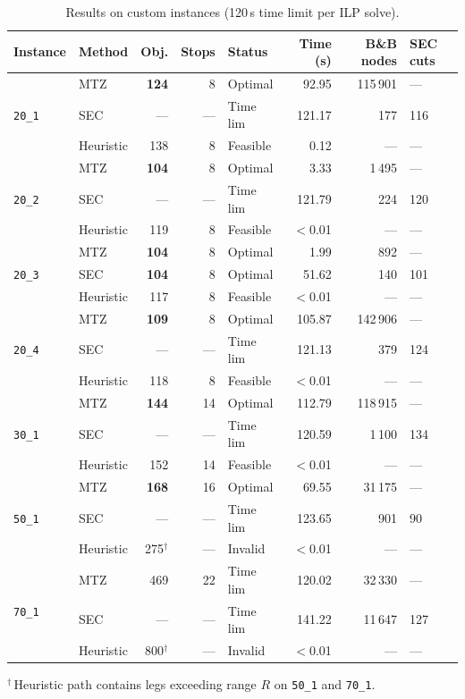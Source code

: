 \documentclass[12pt, a4paper]{article}
\begin{document}
\begin{table}[H]
\centering
\caption{Results on custom instances (120\,s time limit per ILP solve).}
\label{tab:custom_results}
\begin{tabular}{llrrlrrl}
\toprule
Instance & Method & Obj. & Stops & Status & Time (s) & B\&B nodes & SEC cuts \\
\midrule
\multirow{3}{*}{\texttt{20\_1}}
  & MTZ       & \textbf{124} & 8 & Optimal   &  92.95 & 115\,901 & --- \\
  & SEC       & ---          & --- & Time lim &121.17  &      177 & 116 \\
  & Heuristic & 138          & 8 & Feasible  &   0.12 & ---      & --- \\
\midrule
\multirow{3}{*}{\texttt{20\_2}}
  & MTZ       & \textbf{104} & 8 & Optimal   &   3.33 &   1\,495 & --- \\
  & SEC       & ---          & --- & Time lim &121.79  &      224 & 120 \\
  & Heuristic & 119          & 8 & Feasible  &  $<$0.01 & ---    & --- \\
\midrule
\multirow{3}{*}{\texttt{20\_3}}
  & MTZ       & \textbf{104} & 8  & Optimal  &   1.99 &      892 & --- \\
  & SEC       & \textbf{104} & 8  & Optimal  &  51.62 &      140 & 101 \\
  & Heuristic & 117          & 8  & Feasible &  $<$0.01 & ---    & --- \\
\midrule
\multirow{3}{*}{\texttt{20\_4}}
  & MTZ       & \textbf{109} & 8 & Optimal   & 105.87 & 142\,906 & --- \\
  & SEC       & ---          & --- & Time lim &121.13  &      379 & 124 \\
  & Heuristic & 118          & 8 & Feasible  &  $<$0.01 & ---    & --- \\
\midrule
\multirow{3}{*}{\texttt{30\_1}}
  & MTZ       & \textbf{144} & 14 & Optimal  & 112.79 & 118\,915 & --- \\
  & SEC       & ---          & --- & Time lim &120.59  &    1\,100 & 134 \\
  & Heuristic & 152          & 14 & Feasible &  $<$0.01 & ---    & --- \\
\midrule
\multirow{3}{*}{\texttt{50\_1}}
  & MTZ       & \textbf{168} & 16 & Optimal  &  69.55 &  31\,175 & --- \\
  & SEC       & ---          & --- & Time lim &123.65  &      901 & 90 \\
  & Heuristic & 275$^\dagger$ & --- & Invalid &  $<$0.01 & ---    & --- \\
\midrule
\multirow{3}{*}{\texttt{70\_1}}
  & MTZ       & 469 & 22 & Time lim  & 120.02 &  32\,330 & --- \\
  & SEC       & --- & --- & Time lim & 141.22 &  11\,647 & 127 \\
  & Heuristic & 800$^\dagger$ & --- & Invalid &  $<$0.01 & ---    & --- \\
\bottomrule
\end{tabular}
\end{table}
{\small $^\dagger$\,Heuristic path contains legs exceeding range $R$ on \texttt{50\_1} and \texttt{70\_1}.}
\end{document}
